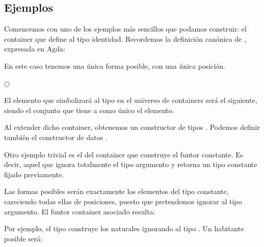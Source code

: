 \subsection{Ejemplos}


\begin{example}
  Comencemos con uno de los ejemplos más sencillos que podamos construir: el container que define al tipo identidad.
  Recordemos la definición canónica de , expresada en Agda:

  
  En este caso tenemos una única forma posible, con una única posición.

\begin{center}
$\bigcirc$
\end{center}

  El elemento que simbolizará al tipo  en el universo de containers será el siguiente, siendo \AgdaDatatype{$\top$} el conjunto que tiene a  como único el elemento.


  
  Al extender dicho container, obtenemos un constructor de tipos . Podemos definir también el constructor de datos .

\end{example}
\vspace{2ex}



\begin{example} \label{cont:k}
  Otro ejemplo trivial es el del container que construye el funtor constante. Es decir, aquel que ignora totalmente el tipo argumento y retorna un tipo constante fijado previamente.


 Las formas posibles serán exactamente los elementos del tipo constante, careciendo todas ellas de posiciones, puesto que pretendemos ignorar al tipo argumento. 
 El funtor container asociado resulta:


 Por ejemplo, el tipo  construye los naturales ignorando al tipo \AgdaDatatype{$\bot$}. Un habitante posible será:


  
\end{example}
\vspace{2ex}

